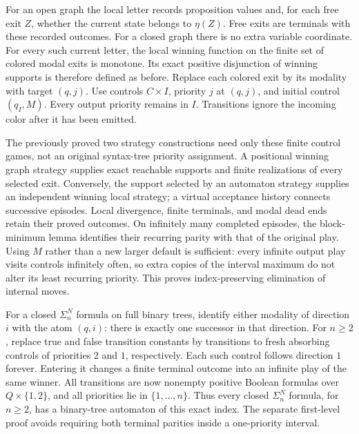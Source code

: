 For an open graph the local
letter records proposition values
and, for each free exit \(Z\),
whether the current state belongs
to \(\eta(Z)\).
Free exits are terminals with
these recorded outcomes.
For a closed graph there
is no extra variable coordinate.
For every such current letter,
the local winning function
on the finite set of
colored modal exits is
monotone. Its exact positive
disjunction of winning
supports is therefore
defined as before.
Replace each colored exit
by its modality with
target \((q,j)\).
Use controls \(C\times I\),
priority \(j\) at \((q,j)\),
and initial control
\((q_I,M)\).
Every output priority
remains in \(I\).
Transitions ignore the
incoming color after
it has been emitted.

The previously proved two
strategy constructions need
only these finite control
games, not an original
syntax-tree priority assignment.
A positional winning graph
strategy supplies exact
reachable supports and
finite realizations of
every selected exit.
Conversely, the support
selected by an automaton
strategy supplies an
independent winning local
strategy; a virtual acceptance
history connects successive
episodes. Local divergence,
finite terminals, and
modal dead ends retain
their proved outcomes.
On infinitely many completed
episodes, the block-minimum
lemma identifies their
recurring parity with that
of the original play.
Using \(M\) rather than
a new larger default is
sufficient: every infinite
output play visits controls
infinitely often, so extra
copies of the interval
maximum do not alter its
least recurring priority.
This proves index-preserving
elimination of internal moves.

For a closed \(\Sigma_n^N\)
formula on full binary
trees, identify either
modality of direction \(i\)
with the atom \((q,i)\):
there is exactly one
successor in that direction.
For \(n\geq2\), replace
true and false transition
constants by transitions
to fresh absorbing controls
of priorities \(2\) and
\(1\), respectively.
Each such control follows
direction \(1\) forever.
Entering it changes a
finite terminal outcome
into an infinite play
of the same winner.
All transitions are now
nonempty positive Boolean
formulas over \(Q\times\{1,2\}\),
and all priorities lie
in \(\{1,\ldots,n\}\).
Thus every closed
\(\Sigma_n^N\) formula,
for \(n\geq2\), has
a binary-tree automaton
of this exact index.
The separate first-level
proof avoids requiring
both terminal parities
inside a one-priority
interval.

